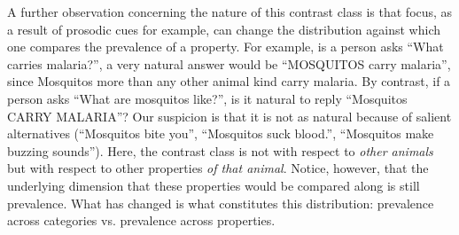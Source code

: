 \documentclass[10pt,letterpaper]{article}
\begin{document}
A further observation concerning the nature of this contrast class is that focus, as a result of prosodic cues for example, can change the distribution against which one compares the prevalence of a property. For example, is a person asks ``What carries malaria?'', a very natural answer would be ``MOSQUITOS carry malaria'', since Mosquitos more than any other animal kind carry malaria. By contrast, if a person asks ``What are mosquitos like?'', is it natural to reply ``Mosquitos CARRY MALARIA''? 
Our suspicion is that it is not as natural because of salient alternatives (``Mosquitos bite you'', ``Mosquitos suck blood.'', ``Mosquitos make buzzing sounds''). 
Here, the contrast class is not with respect to \emph{other animals} but with respect to other properties \emph{of that animal}. 
Notice, however, that the underlying dimension that these properties would be compared along is still prevalence. What has changed is what constitutes this distribution: prevalence across categories vs. prevalence across properties.
\end{document}
